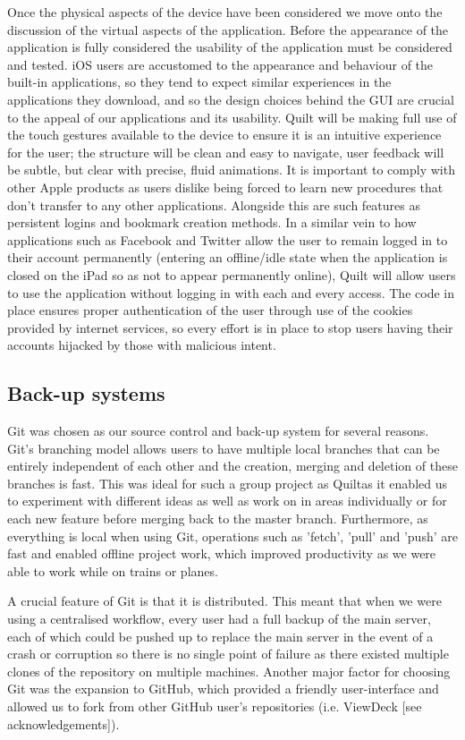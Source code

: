 \documentclass[a4wide, 10pt]{article}
\begin{document}
Once the physical aspects of the device have been considered we move onto the discussion of the virtual aspects of the application. Before the appearance of the application is fully considered the usability of the application must be considered and tested. iOS users are accustomed to the appearance and behaviour of the built-in applications, so they tend to expect similar experiences in the applications they download, and so the design choices behind the GUI are crucial to the appeal of our applications and its usability. Quilt will be making full use of the touch gestures available to the device to ensure it is an intuitive experience for the user; the structure will be clean and easy to navigate, user feedback will be subtle, but clear with precise, fluid animations. It is important to comply with other Apple products as users dislike being forced to learn new procedures that don't transfer to any other applications. Alongside this are such features as persistent logins and bookmark creation methods. In a similar vein to how applications such as Facebook and Twitter allow the user to remain logged in to their account permanently (entering an offline/idle state when the application is closed on the iPad so as not to appear permanently online), Quilt will allow users to use the application without logging in with each and every access. The code in place ensures proper authentication of the user through use of the cookies provided by internet services, so every effort is in place to stop users having their accounts hijacked by those with malicious intent. 

\subsection{Back-up systems}

Git was chosen as our source control and back-up system for several reasons. Git's branching model allows users to have multiple local branches that can be entirely independent of each other and the creation, merging and deletion of these branches is fast. This was ideal for such a group project as Quiltas it enabled us to experiment with different ideas as well as work on in areas individually or for each new feature before merging back to the master branch. Furthermore, as everything is local when using Git, operations such as 'fetch', 'pull' and 'push' are fast and enabled offline project work, which improved productivity as we were able to work while on trains or planes.  

A crucial feature of Git is that it is distributed. This meant that when we were using a centralised workflow, every user had a full backup of the main server, each of which could be pushed up to replace the main server in the event of a crash or corruption so there is no single point of failure as there existed multiple clones of the repository on multiple machines. Another major factor for choosing Git was the expansion to GitHub, which provided a friendly user-interface and allowed us to fork from other GitHub user's repositories (i.e. ViewDeck [see acknowledgements]).
\end{document}
